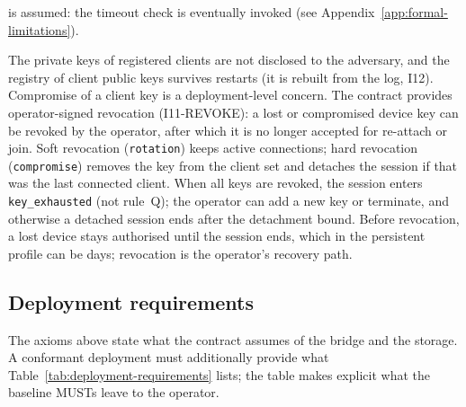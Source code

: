 \begin{description}[leftmargin=2em]
is assumed: the timeout check is eventually invoked (see
Appendix~\ref{app:formal-limitations}).
\item[A7 --- Key custody.] The private keys of registered clients are
not disclosed to the adversary, and the registry of client public keys
survives restarts (it is rebuilt from the log, I12). Compromise of a
client key is a deployment-level concern. The contract provides
operator-signed revocation (I11-REVOKE): a lost or compromised device
key can be revoked by the operator, after which it is no longer
accepted for re-attach or join. Soft revocation (\texttt{rotation})
keeps active connections; hard revocation (\texttt{compromise})
removes the key from the client set and detaches the session if that was
the last connected client. When all keys are revoked, the session enters
\texttt{key\_exhausted} (not rule~Q); the operator can add a new key
or terminate, and otherwise a detached session ends after the detachment
bound. Before revocation, a lost device stays authorised
until the session ends, which in the persistent profile can be
days; revocation is the operator's recovery path.
\end{description}

\subsection{Deployment requirements}
\label{sec:deployment-requirements}

The axioms above state what the contract assumes of the bridge and the
storage. A conformant deployment must additionally provide what
Table~\ref{tab:deployment-requirements} lists; the table makes explicit
what the baseline MUSTs leave to the operator.

